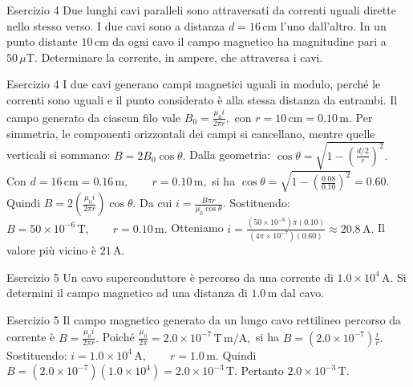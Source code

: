 \documentclass[a4paper]{article}
\begin{document}
\begin{snippetexercise}{Esercizio 4}
    Due lunghi cavi paralleli sono attraversati da correnti uguali dirette nello
    stesso verso. I due cavi sono a distanza \(d = 16\,\mathrm{cm}\) l'uno
    dall'altro. In un punto distante \(10\,\mathrm{cm}\) da ogni cavo il campo
    magnetico ha magnitudine pari a \(50\,\mu\mathrm{T}\). Determinare la
    corrente, in ampere, che attraversa i cavi.

\end{snippetexercise}
\begin{snippetsolution}{Esercizio 4}
    I due cavi generano campi magnetici uguali in modulo, perché le correnti
    sono uguali e il punto considerato è alla stessa distanza da entrambi.
    Il campo generato da ciascun filo vale
    \(B_0 = \frac{\mu_0 i}{2\pi r},\)
    con
    \(r = 10\,\mathrm{cm} = 0.10\,\mathrm{m}.\)
    Per simmetria, le componenti orizzontali dei campi si cancellano, mentre
    quelle verticali si sommano:
    \(B = 2B_0\cos\theta.\)
    Dalla geometria:
    \(\cos\theta = \sqrt{ 1- \left( \frac{d/2}{r} \right)^2 }.\)
    Con
    \(d = 16\,\mathrm{cm} = 0.16\,\mathrm{m}, \qquad r = 0.10\,\mathrm{m},\)
    si ha
    \(\cos\theta = \sqrt{ 1- \left( \frac{0.08}{0.10} \right)^2 } = 0.60.\)
    Quindi
    \(B = 2 \left( \frac{\mu_0 i}{2\pi r} \right) \cos\theta.\)
    Da cui
    \(i = \frac{B\pi r}{\mu_0\cos\theta}.\)
    Sostituendo:
    \(B = 50 \times 10^{-6}\,\mathrm{T}, \qquad r = 0.10\,\mathrm{m}.\)
    Otteniamo
    \(i = \frac{ \left(50 \times 10^{-6}\right)\pi(0.10) }{ \left(4\pi \times 10^{-7}\right)(0.60) } \approx 20.8\,\mathrm{A}.\)
    Il valore più vicino è
    \(\boxed{21\,\mathrm{A}}.\)
\end{snippetsolution}
\begin{snippetexercise}{Esercizio 5}
    Un cavo superconduttore è percorso da una corrente di
    \(1.0 \times 10^4\,\mathrm{A}\). Si determini il campo magnetico ad una
    distanza di \(1.0\,\mathrm{m}\) dal cavo.

\end{snippetexercise}
\begin{snippetsolution}{Esercizio 5}
    Il campo magnetico generato da un lungo cavo rettilineo percorso da
    corrente è
    \(B = \frac{\mu_0 i}{2\pi r}.\)
    Poiché
    \(\frac{\mu_0}{2\pi} = 2.0 \times 10^{-7}\,\mathrm{T\,m/A},\)
    si ha
    \(B = \left(2.0 \times 10^{-7}\right) \frac{i}{r}.\)
    Sostituendo:
    \(i = 1.0 \times 10^4\,\mathrm{A}, \qquad r = 1.0\,\mathrm{m}.\)
    Quindi
    \(B = \left(2.0 \times 10^{-7}\right) \left(1.0 \times 10^4\right) = 2.0 \times 10^{-3}\,\mathrm{T}.\)
    Pertanto
    \(\boxed{2.0 \times 10^{-3}\,\mathrm{T}}.\)
\end{snippetsolution}
\end{document}
